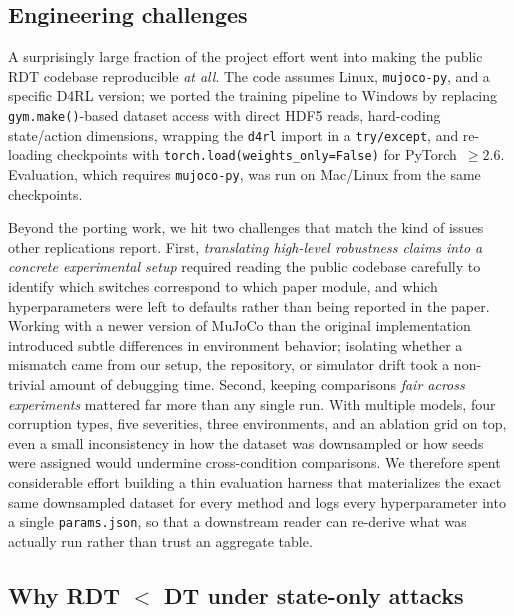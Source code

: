 \documentclass[10pt,twocolumn,letterpaper]{article}
\begin{document}
\subsection{Engineering challenges}

A surprisingly large fraction of the project effort went into making the
public RDT codebase reproducible \emph{at all}. The code assumes Linux,
\texttt{mujoco-py}, and a specific D4RL version; we ported the training
pipeline to Windows by replacing \texttt{gym.make()}-based dataset access
with direct HDF5 reads, hard-coding state/action dimensions, wrapping the
\texttt{d4rl} import in a \texttt{try/except}, and re-loading checkpoints
with \texttt{torch.load(weights\_only=False)} for PyTorch~$\geq\!2.6$.
Evaluation, which requires \texttt{mujoco-py}, was run on Mac/Linux from
the same checkpoints.

Beyond the porting work, we hit two challenges that match the kind of
issues other replications report. First, \emph{translating high-level
robustness claims into a concrete experimental setup} required reading the
public codebase carefully to identify which switches correspond to which
paper module, and which hyperparameters were left to defaults rather than
being reported in the paper. Working with a newer version of MuJoCo than
the original implementation introduced subtle differences in environment
behavior; isolating whether a mismatch came from our setup, the
repository, or simulator drift took a non-trivial amount of debugging time.
Second, keeping comparisons \emph{fair across experiments} mattered far
more than any single run. With multiple models, four corruption types,
five severities, three environments, and an ablation grid on top, even a
small inconsistency in how the dataset was downsampled or how seeds were
assigned would undermine cross-condition comparisons. We therefore spent
considerable effort building a thin evaluation harness that materializes
the exact same downsampled dataset for every method and logs every
hyperparameter into a single \texttt{params.json}, so that a downstream
reader can re-derive what was actually run rather than trust an aggregate
table.

\subsection{Why RDT $<$ DT under state-only attacks}
\end{document}
